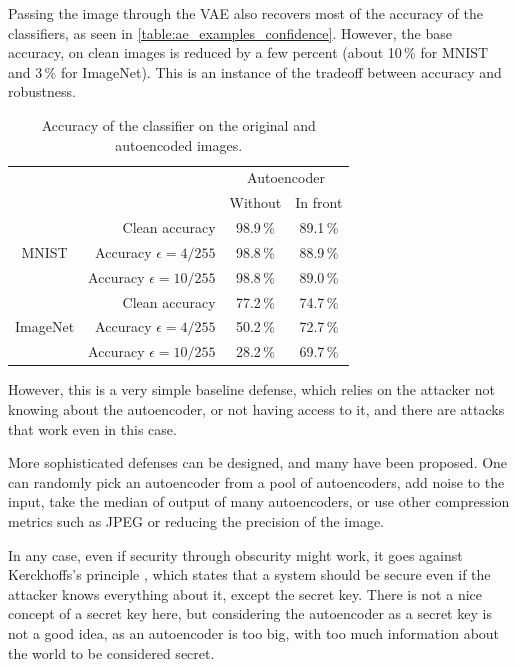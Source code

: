 \documentclass[]{scrarticle}
\renewcommand{\todo}[1]{}
\begin{document}
Passing the image through the VAE also recovers most of the accuracy
of the classifiers, as seen in \autoref{table:ae_examples_confidence}.
However, the base accuracy, on clean images is reduced by a few percent
(about 10\,\% for MNIST and 3\,\% for ImageNet).
This is an instance of the tradeoff between accuracy and robustness.

\begin{table}[h]
  \centering

    \begin{tabular}{c|r|cc}
    & & \multicolumn{2}{c}{Autoencoder} \\
    & & Without & In front \\
    \hline
    \multirow{3}{*}{MNIST}
    &  Clean accuracy			& 98.9\,\%	& 89.1\,\%	\\
    &  Accuracy $\epsilon=4/255$	& 98.8\,\%	& 88.9\,\%	\\
    &  Accuracy $\epsilon=10/255$	& 98.8\,\%	& 89.0\,\%	\\
    \hline
    \multirow{3}{*}{ImageNet}
    &  Clean accuracy			& 77.2\,\%	& 74.7\,\%	\\
    &  Accuracy $\epsilon=4/255$	& 50.2\,\%	& 72.7\,\%	\\
    &  Accuracy $\epsilon=10/255$	& 28.2\,\%	& 69.7\,\%	\\
  \end{tabular}

  \caption{Accuracy of the classifier on the original and autoencoded images.}
  \label{table:ae_examples_confidence}
\end{table}

However, this is a very simple baseline defense, which relies on the attacker
not knowing about the autoencoder, or not having access to it,
and there are attacks that work even in this case.
\todo{Add reference to the paper that does this}

More sophisticated defenses can be designed, and many have been proposed.
One can randomly pick an autoencoder from a pool of autoencoders,
add noise to the input, take the median of output of many autoencoders,
or use other compression metrics such as JPEG \cite{Shin2017JPEGresistantAI}
or reducing the precision of the image.
\todo{Add reference to the paper that does this}

In any case, even if security through obscurity might work,
it goes against Kerckhoffs's principle \cite{kerckhoffs1883cryptographie},
which states that a system should be secure even if the attacker
knows everything about it, except the secret key.
There is not a nice concept of a secret key here,
but considering the autoencoder as a secret key is not a good idea,
as an autoencoder is too big, with too much information about the world
to be considered secret.
\end{document}

